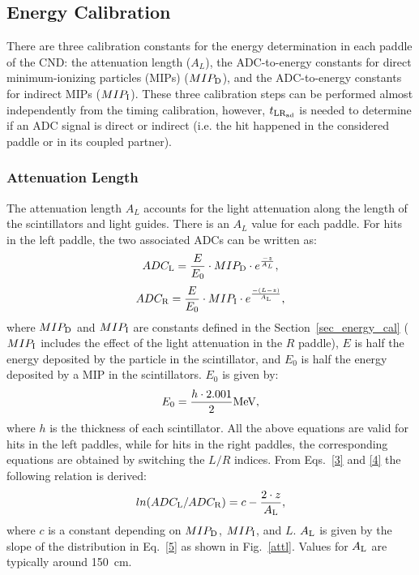 \subsection{Energy Calibration}

There are three calibration constants for the energy determination in each paddle of the CND: the attenuation length ($A_{L}$), the ADC-to-energy constants for direct minimum-ionizing particles (MIPs) ($MIP_{\rm{D}}$), and the ADC-to-energy constants for indirect MIPs ($MIP_{\rm{I}}$).
These three calibration steps can be performed almost independently from the timing calibration, however, $t_{\rm{LR_{\rm{ad}}}}$ is needed to determine if an ADC signal is direct or indirect (i.e. the hit happened in the considered paddle or in its coupled partner).

\subsubsection{Attenuation Length}

The attenuation length $A_{L}$ accounts for the light attenuation along the length of the scintillators and light guides. There is an $A_{L}$ value for each paddle.
For hits in the left paddle, the two associated ADCs can be written as:
\begin{equation}
\label{3}
ADC_{\rm{L}}=\frac{E}{E_0}\cdot MIP_{\rm{D}}\cdot e^{\frac{-z}{A_{L}}},
\end{equation}
\begin{equation}
\label{4}
ADC_{\rm{R}}=\frac{E}{E_0}\cdot MIP_{\rm{I}}\cdot e^{\frac{-(L-z)}{A_{\rm{L}}}},
\end{equation}
where $MIP_{\rm{D}}$ and $MIP_{\rm{I}}$ are constants defined in the Section~\ref{sec_energy_cal} ($MIP_{\rm{I}}$ includes the effect of the light attenuation in the $R$ paddle), $E$ is half the energy deposited by the particle in the scintillator, and $E_0$ is half the energy deposited by a MIP in the scintillators.
$E_0$ is given by:
\begin{equation}\label{eq_def_e0}
E_0=\frac{h\cdot 2.001}{2} \rm{MeV},
\end{equation}
where $h$ is the thickness of each scintillator.
All the above equations are valid for hits in the left paddles, while for hits in the right paddles, the corresponding equations are obtained by switching the $L/R$ indices.
From Eqs.~\ref{3} and \ref{4} the following relation is derived:
\begin{equation}
\label{5}
ln(ADC_{\rm{L}}/ADC_{\rm{R}})=c-\frac{2\cdot z}{A_{\rm{L}}},
\end{equation}
where $c$ is a constant depending on $MIP_{\rm{D}}$, $MIP_{\rm{I}}$, and $L$. $A_{\rm{L}}$ is given by the slope of the distribution in Eq.~\ref{5} as shown in Fig.~\ref{attl}. Values for $A_{\rm{L}}$ are typically around 150~cm.

